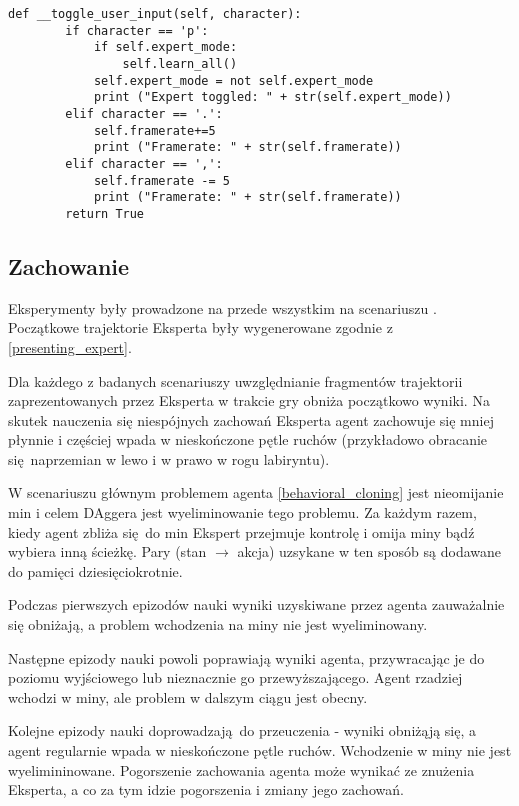 \begin{lstlisting}[language=iPython]
    def __toggle_user_input(self, character):
        if character == 'p':
            if self.expert_mode:
                self.learn_all()
            self.expert_mode = not self.expert_mode
            print ("Expert toggled: " + str(self.expert_mode))
        elif character == '.':
            self.framerate+=5
            print ("Framerate: " + str(self.framerate))
        elif character == ',':
            self.framerate -= 5
            print ("Framerate: " + str(self.framerate))
        return True
\end{lstlisting}

\subsection{Zachowanie}
Eksperymenty były prowadzone na przede wszystkim na scenariuszu . Początkowe trajektorie Eksperta były wygenerowane zgodnie z \ref{presenting_expert}.

Dla każdego z badanych scenariuszy uwzględnianie fragmentów trajektorii zaprezentowanych przez Eksperta w trakcie gry obniża początkowo wyniki. Na skutek nauczenia się niespójnych zachowań Eksperta agent zachowuje się mniej płynnie i częściej wpada w nieskończone pętle ruchów (przykładowo obracanie się naprzemian w lewo i w prawo w rogu labiryntu).

W scenariuszu  głównym problemem agenta \ref{behavioral_cloning} jest nieomijanie min i celem DAggera jest wyeliminowanie tego problemu. Za każdym razem, kiedy agent zbliża się do min Ekspert przejmuje kontrolę i omija miny bądź wybiera inną ścieżkę. Pary (stan $\to$ akcja) uzsykane w ten sposób są dodawane do pamięci dziesięciokrotnie.

Podczas pierwszych epizodów nauki wyniki uzyskiwane przez agenta zauważalnie się obniżają, a problem wchodzenia na miny nie jest wyeliminowany.

Następne epizody nauki powoli poprawiają wyniki agenta, przywracając je do poziomu wyjściowego lub nieznacznie go przewyższającego. Agent rzadziej wchodzi w miny, ale problem w dalszym ciągu jest obecny.

Kolejne epizody nauki doprowadzają do przeuczenia - wyniki obniżąją się, a agent regularnie wpada w nieskończone pętle ruchów. Wchodzenie w miny nie jest wyelimininowane. Pogorszenie zachowania agenta może wynikać ze znużenia Eksperta, a co za tym idzie pogorszenia i zmiany jego zachowań.

